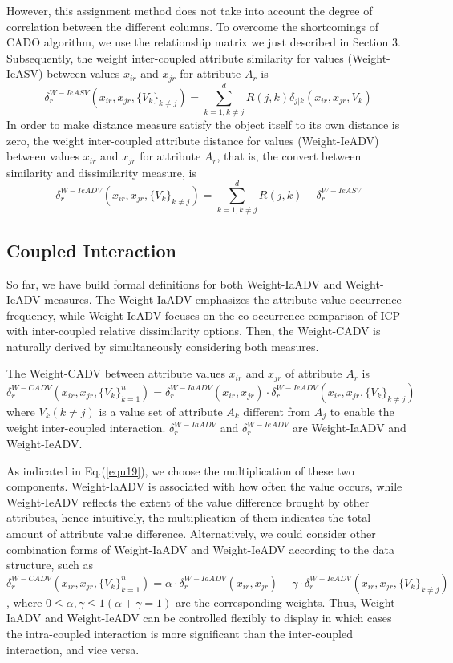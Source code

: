 \documentclass[review]{elsarticle}
\begin{document}
However, this assignment method does not take into account the degree of correlation between the different columns. To overcome the shortcomings of CADO algorithm, we use the relationship matrix we just described in Section 3.
Subsequently, the weight inter-coupled attribute similarity for values (Weight-IeASV) between values $x_{ir}$ and $x_{jr}$ for attribute $A_r$ is
\begin{equation}
\delta_{r}^{W-IeASV}(x_{ir},x_{jr},\{V_k\}_{k \neq j}) = \sum_{k=1,k \neq j}^{d} R(j,k) \delta_{j|k}(x_{ir},x_{jr},V_k)
\label{equ17}
\end{equation}
In order to make distance measure satisfy the object itself to its own distance is zero, the weight inter-coupled attribute distance for values (Weight-IeADV) between values $x_{ir}$ and $x_{jr}$ for attribute $A_r$, that is, the convert between similarity and dissimilarity measure, is
\begin{equation}
\delta_{r}^{W-IeADV}(x_{ir},x_{jr},\{V_k\}_{k \neq j}) = \sum_{k=1,k \neq j}^{d} R(j,k) - \delta_{r}^{W-IeASV}
\label{equ18}
\end{equation}

\subsection{Coupled Interaction}
So far, we have build formal definitions for both Weight-IaADV and Weight-IeADV measures. The Weight-IaADV emphasizes the attribute value occurrence frequency, while Weight-IeADV focuses on the co-occurrence comparison of ICP with inter-coupled relative dissimilarity options. Then, the Weight-CADV is naturally derived by simultaneously considering both measures.

The Weight-CADV between attribute values $x_{ir}$ and $x_{jr}$ of attribute $A_r$ is
\begin{equation}
\delta_{r}^{W-CADV}(x_{ir},x_{jr},\{V_k\}_{k = 1} ^ n) = \delta_{r}^{W-IaADV}(x_{ir},x_{jr}) \cdot \delta_{r}^{W-IeADV}(x_{ir},x_{jr},\{V_k\}_{k \neq j})
\label{equ19}
\end{equation}
where $V_k (k \neq j)$ is a value set of attribute $A_k$ different from $A_j$ to enable the weight inter-coupled interaction. $\delta_{r}^{W-IaADV}$ and $\delta_{r}^{W-IeADV}$ are Weight-IaADV and Weight-IeADV.

As indicated in Eq.(\ref{equ19}), we choose the multiplication of these two components. Weight-IaADV is associated with how often the value occurs, while Weight-IeADV reflects the extent of the value difference brought by other attributes, hence intuitively, the multiplication of them indicates the total amount of attribute value difference. Alternatively, we could consider other combination forms of Weight-IaADV and Weight-IeADV according to the data structure, such as $\delta_{r}^{W-CADV}(x_{ir},x_{jr},\{V_k\}_{k = 1} ^ n) = \alpha \cdot \delta_{r}^{W-IaADV}(x_{ir},x_{jr}) + \gamma \cdot \delta_{r}^{W-IeADV}(x_{ir},x_{jr},\{V_k\}_{k \neq j})$, where $0 \leq \alpha,\gamma \leq 1 (\alpha+\gamma = 1)$
are the corresponding weights. Thus, Weight-IaADV and Weight-IeADV can be controlled flexibly to display in which cases the intra-coupled interaction is more significant than the inter-coupled interaction, and vice versa.
\end{document}
